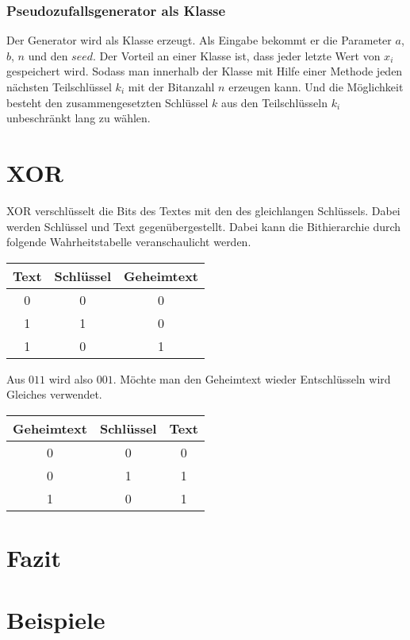 \documentclass[10pt,a4paper]{article}
\begin{document}
\subsubsection{Pseudozufallsgenerator als Klasse}
Der Generator wird als Klasse erzeugt. Als Eingabe bekommt er die Parameter $a$, $b$, $n$ und
den $seed$. Der Vorteil an einer Klasse ist, dass jeder letzte Wert von $x_i$ gespeichert wird. Sodass
man innerhalb der Klasse mit Hilfe einer Methode jeden nächsten Teilschlüssel $k_i$ mit der
Bitanzahl $n$ erzeugen kann. Und die Möglichkeit besteht den zusammengesetzten Schlüssel $k$
aus den Teilschlüsseln $k_i$ unbeschränkt lang zu wählen.
\section{XOR}
XOR verschlüsselt die Bits des Textes mit den des gleichlangen Schlüssels. Dabei werden Schlüssel und Text gegenübergestellt. Dabei kann die \glqq Bithierarchie\grqq{} durch folgende Wahrheitstabelle veranschaulicht werden.
\medskip
 
\begin{tabular}[h]{c|c|c}
Text & Schlüssel & Geheimtext\\
\hline
0 & 0 & 0\\
\hline
1 & 1 & 0\\
\hline
1 & 0 & 1\\
\end{tabular}

\medskip
Aus $011$ wird also $001$. Möchte man den Geheimtext wieder Entschlüsseln wird Gleiches verwendet.
\medskip

\begin{tabular}[h]{c|c|c}
Geheimtext & Schlüssel & Text\\
\hline
0 & 0 & 0\\
\hline
0 & 1 & 1\\
\hline
1 & 0 & 1\\
\end{tabular}
\section{Fazit}
\section{Beispiele}
\end{document}
